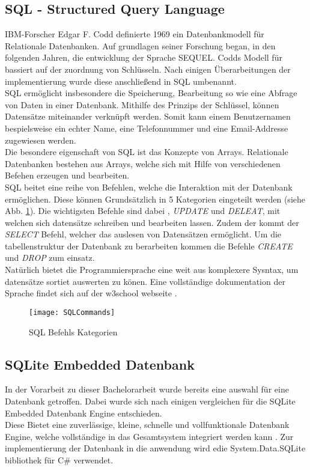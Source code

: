 \subsection{SQL - Structured Query Language}
IBM-Forscher Edgar F. Codd definierte 1969 ein Datenbankmodell für Relationale Datenbanken. Auf grundlagen seiner Forschung began, in den folgenden Jahren, die entwicklung der Sprache \ac{SEQUEL}. Codds Modell für bassiert auf der zuordnung von Schlüsseln. Nach einigen Überarbeitungen der implementierung wurde diese anschließend in \ac{SQL} umbenannt.\\
\ac{SQL} ermöglicht insbesondere die Speicherung, Bearbeitung so wie eine Abfrage von Daten in einer Datenbank. Mithilfe des Prinzips der Schlüssel, können Datensätze miteinander verknüpft werden. Somit kann einem Benutzernamen bespielsweise ein echter Name, eine Telefonnummer und eine Email-Addresse zugewiesen werden.\\
Die besondere eigenschaft von \ac{SQL} ist das Konzepte von Arrays. Relationale Datenbanken bestehen aus Arrays, welche sich mit Hilfe von verschiedenen Befehen erzeugen und bearbeiten. \cite{SQL}\\
\ac{SQL} beitet eine reihe von Befehlen, welche die Interaktion mit der Datenbank ermöglichen. Diese können Grundsätzlich in 5 Kategorien eingeteilt werden (siehe Abb. \ref{fig:SQLCommands}). Die wichtigsten Befehle sind dabei , \textit{UPDATE} und \textit{DELEAT}, mit welchen sich datensätze schreiben und bearbeiten lassen. Zudem der kommt der \textit{SELECT} Befehl, welcher das auslesen von Datensätzen ermöglicht. Um die tabellenstruktur der Datenbank zu berarbeiten kommen die Befehle \textit{CREATE} und \textit{DROP} zum einsatz. \cite{SQLCommands}\\
Natürlich bietet die Programmiersprache eine weit aus komplexere Sysntax, um datensätze sortiet auswerten zu könen. Eine vollständige dokumentation der Sprache findet sich auf der w3school webseite \cite{SQLDoku}.
\begin{center}
    \begin{figure}[h!]
     \centering
     \texttt{[image: SQLCommands]}
     \caption{SQL Befehls Kategorien \cite{SQLCommands}}
    \label{fig:SQLCommands}
    \end{figure}
   \end{center}

\subsection{SQLite Embedded Datenbank}
In der Vorarbeit zu dieser Bachelorarbeit wurde bereits eine auswahl für eine Datenbank getroffen. Dabei wurde sich nach einigen vergleichen für die SQLite Embedded Datenbank Engine entschieden. \\
Diese Bietet eine zuverlässige, kleine, schnelle und vollfunktionale Datenbank Engine, welche vollständige in das Gesamtsystem integriert werden kann \cite{SQLiteHompage}. Zur implementierung der Datenbank in die anwendung wird edie System.Data.SQLite bibliothek für C\# verwendet.\\

